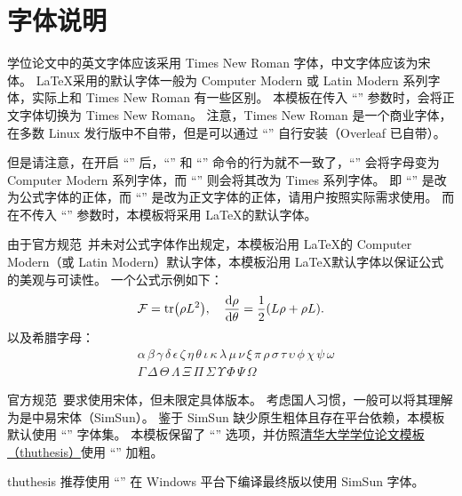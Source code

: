 \section{字体说明}\label{sec:fonts}

学位论文中的英文字体应该采用 Times New Roman 字体，中文字体应该为宋体。
\LaTeX 采用的默认字体一般为 Computer Modern 或 Latin Modern 系列字体，实际上和 Times New Roman 有一些区别。
本模板在传入 ``'' 参数时，会将正文字体切换为 Times New Roman。
注意，Times New Roman 是一个商业字体，在多数 Linux 发行版中不自带，但是可以通过 ``'' 自行安装（Overleaf 已自带）。

但是请注意，在开启 ``'' 后，``'' 和 ``'' 命令的行为就不一致了，``'' 会将字母变为 Computer Modern 系列字体，而 ``'' 则会将其改为 Times 系列字体。
即 ``'' 是改为公式字体的正体，而 ``'' 是改为正文字体的正体，请用户按照实际需求使用。
而在不传入 ``'' 参数时，本模板将采用 \LaTeX 的默认字体。

由于官方规范~\cite{hdy2012311}并未对公式字体作出规定，本模板沿用 \LaTeX 的 Computer Modern（或 Latin Modern）默认字体，本模板沿用 \LaTeX 默认字体以保证公式的美观与可读性。
一个公式示例如下：
\begin{equation}
  \mathcal{F} = \tr(\rho L^2),\quad \dv{\rho}{\theta}=\frac12\qty(L \rho  + \rho L).
\end{equation}
以及希腊字母：
\begin{equation}
  \begin{aligned}
    & \alpha\, \beta\, \gamma\, \delta\, \epsilon\, \zeta\, \eta\, \theta\, \iota\, \kappa\, \lambda\, \mu\, \nu\, \xi\, \pi\, \rho\, \sigma\, \tau\, \upsilon\, \phi\, \chi\, \psi\, \omega \\
    & \Gamma\, \Delta\, \Theta\, \Lambda\, \Xi\, \Pi\, \Sigma\, \Upsilon\, \Phi\, \Psi\, \Omega
  \end{aligned}
\end{equation}

官方规范~\cite{hdy2012311}要求使用宋体，但未限定具体版本。
考虑国人习惯，一般可以将其理解为是中易宋体（SimSun）。
鉴于 SimSun 缺少原生粗体且存在平台依赖，本模板默认使用 ``'' 字体集。
本模板保留了 ``'' 选项，并仿照\href{https://github.com/tuna/thuthesis}{清华大学学位论文模板（thuthesis）}使用 ``'' 加粗。

thuthesis 推荐使用 ``'' 在 Windows 平台下编译最终版以使用 SimSun 字体。


